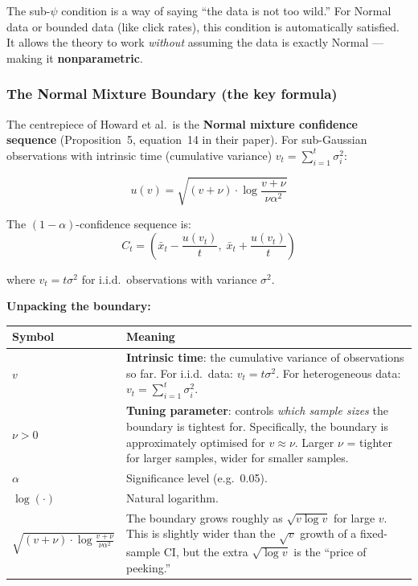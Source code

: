 \documentclass[12pt, a4paper]{article}
\begin{document}
\begin{plainlanguage}
The sub-$\psi$ condition is a way of saying ``the data is not too wild.''
For Normal data or bounded data (like click rates), this condition is
automatically satisfied.  It allows the theory to work \emph{without}
assuming the data is exactly Normal --- making it \textbf{nonparametric}.
\end{plainlanguage}

\subsubsection*{The Normal Mixture Boundary (the key formula)}

The centrepiece of Howard et al.\ is the \textbf{Normal mixture confidence
sequence} (Proposition~5, equation~14 in their paper).  For sub-Gaussian
observations with intrinsic time (cumulative variance) $v_t = \sum_{i=1}^t
\sigma_i^2$:

\[
  \boxed{u(v) = \sqrt{(v + \nu) \cdot \log\!\frac{v + \nu}{\nu \alpha^2}}}
\]

The $(1-\alpha)$-confidence sequence is:
\[
  C_t = \left(\bar{x}_t - \frac{u(v_t)}{t},\; \bar{x}_t + \frac{u(v_t)}{t}
        \right)
\]

where $v_t = t\sigma^2$ for i.i.d.\ observations with variance $\sigma^2$.

\textbf{Unpacking the boundary:}

\begin{center}
\renewcommand{\arraystretch}{1.4}
\begin{tabular}{@{} >{\raggedright}p{2.5cm} p{9.5cm} @{}}
\toprule
\textbf{Symbol} & \textbf{Meaning} \\
\midrule
$v$ & \textbf{Intrinsic time}: the cumulative variance of observations so far.
  For i.i.d.\ data: $v_t = t\sigma^2$.  For heterogeneous data: $v_t =
  \sum_{i=1}^t \sigma_i^2$. \\
$\nu > 0$ & \textbf{Tuning parameter}: controls \emph{which sample sizes} the
  boundary is tightest for.  Specifically, the boundary is approximately
  optimised for $v \approx \nu$.  Larger $\nu$ = tighter for larger samples,
  wider for smaller samples. \\
$\alpha$ & Significance level (e.g.\ 0.05). \\
$\log(\cdot)$ & Natural logarithm. \\
$\sqrt{(v+\nu) \cdot \log\frac{v+\nu}{\nu\alpha^2}}$
  & The boundary grows roughly as $\sqrt{v \log v}$ for large $v$.  This is
  slightly wider than the $\sqrt{v}$ growth of a fixed-sample CI, but the
  extra $\sqrt{\log v}$ is the ``price of peeking.'' \\
\bottomrule
\end{tabular}
\end{center}
\end{document}
